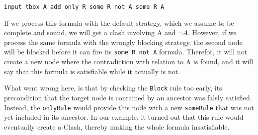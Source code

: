 \documentclass[11pt]{article} %
\begin{document}
\begin{center}
\texttt{input tbox A add only R some R not A some R A}
\end{center}

If we process this formula with the default strategy, which we assume to be complete and sound, we will get a clash involving A and $\neg A$. However, if we process the same formula with the wrongly blocking strategy, the second node will be blocked before it can fire its \texttt{some R not A} formula. Therefor, it will not create a new node where the contradiction with relation to A is found, and it will say that this formula is satisfiable while it actually is not.

What went wrong here, is that by checking the \texttt{Block} rule too early, its precondition that the target node is contained by an ancestor was falsly satisfied. Instead, the \texttt{onlyRule} would provide this node with a new \texttt{someRule} that was not yet included in its ancestor. In our example, it turned out that this rule would eventually create a Clash, thereby making the whole formula insatisfiable.
 
\end{document}
